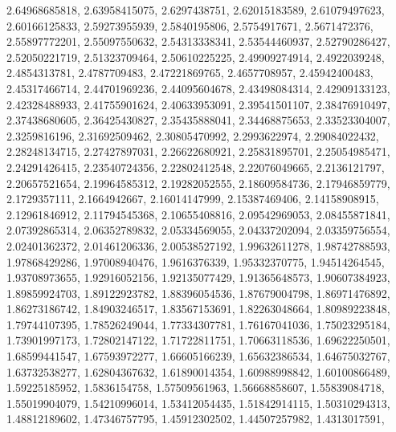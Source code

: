 \begin{code}
\begin{hide}
{     2.64968685818,     2.63958415075,      2.6297438751,
     2.62015183589,     2.61079497623,     2.60166125833,
     2.59273955939,      2.5840195806,      2.5754917671,
      2.5671472376,     2.55897772201,     2.55097550632,
     2.54313338341,     2.53544460937,     2.52790286427,
     2.52050221719,     2.51323709464,     2.50610225225,
     2.49909274914,      2.4922039248,      2.4854313781,
      2.4787709483,     2.47221869765,      2.4657708957,
     2.45942400483,     2.45317466714,     2.44701969236,
     2.44095604678,     2.43498084314,     2.42909133123,
     2.42328488933,     2.41755901624,     2.40633953091,
     2.39541501107,     2.38476910497,     2.37438680605,
     2.36425430827,     2.35435888041,     2.34468875653,
     2.33523304007,      2.3259816196,     2.31692509462,
     2.30805470992,      2.2993622974,     2.29084022432,
     2.28248134715,     2.27427897031,     2.26622680921,
     2.25831895701,     2.25054985471,     2.24291426415,
     2.23540724356,     2.22802412548,     2.22076049665,
      2.2136121797,     2.20657521654,     2.19964585312,
     2.19282052555,     2.18609584736,     2.17946859779,
      2.1729357111,      2.1664942667,     2.16014147999,
     2.15387469406,     2.14158908915,     2.12961846912,
     2.11794545368,     2.10655408816,     2.09542969053,
     2.08455871841,     2.07392865314,     2.06352789832,
     2.05334569055,     2.04337202094,     2.03359756554,
     2.02401362372,     2.01461206336,     2.00538527192,
     1.99632611278,     1.98742788593,     1.97868429286,
     1.97008940476,      1.9616376339,     1.95332370775,
     1.94514264545,     1.93708973655,     1.92916052156,
     1.92135077429,     1.91365648573,     1.90607384923,
     1.89859924703,     1.89122923782,     1.88396054536,
     1.87679004798,     1.86971476892,     1.86273186742,
     1.84903246517,     1.83567153691,     1.82263048664,
     1.80989223848,     1.79744107395,     1.78526249044,
     1.77334307781,     1.76167041036,     1.75023295184,
     1.73901997173,     1.72802147122,     1.71722811751,
     1.70663118536,     1.69622250501,     1.68599441547,
     1.67593972277,     1.66605166239,     1.65632386534,
     1.64675032767,     1.63732538277,     1.62804367632,
     1.61890014354,     1.60988998842,     1.60100866489,
     1.59225185952,      1.5836154758,     1.57509561963,
     1.56668858607,     1.55839084718,     1.55019904079,
     1.54210996014,     1.53412054435,     1.51842914115,
     1.50310294313,     1.48812189602,     1.47346757795,
     1.45912302502,     1.44507257982,      1.4313017591,
}
\end{hide}
\end{code}
